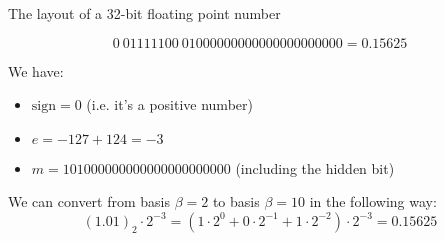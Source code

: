 \begin{example}
    The layout of a 32-bit floating point number
    
    $$ 0\ 01111100\ 01000000000000000000000 = 0.15625 $$
    
    We have:
    \begin{itemize}
        \item $\textrm{sign} = 0$ (i.e. it's a positive number)
        \item $e = -127 + 124 = -3$
        \item $m = 101000000000000000000000$ (including the hidden bit)
    \end{itemize}
    
    We can convert from basis $\beta=2$ to basis $\beta=10$  in the following way:
    $$ (1.01)_2 \cdot 2^{-3} = (1 \cdot 2^{0} + 0 \cdot 2^{-1} + 1 \cdot 2^{-2}) \cdot 2^{-3} = 0.15625 $$
\end{example}
